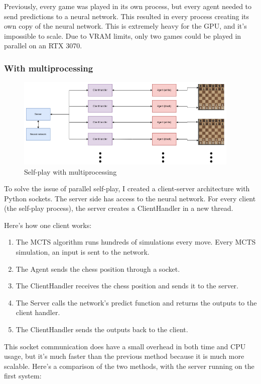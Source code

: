 \documentclass{article}
\begin{document}
Previously, every game was played in its own process, but every agent needed to send predictions to a neural network.
This resulted in every process creating its own copy of the neural network. This is extremely heavy for the GPU, and
it's impossible to scale. Due to VRAM limits, only two games could be played in parallel on an RTX 3070.

\subsubsection{With multiprocessing}

\begin{figure}[H]
    \centering
    \includegraphics[width=0.95\textwidth]{img/with-multiprocessing.png}
    \caption{Self-play with multiprocessing}
\end{figure}

To solve the issue of parallel self-play, I created a client-server architecture with Python sockets.
The server side has access to the neural network. For every client (the self-play process), 
the server creates a ClientHandler in a new thread.

Here's how one client works:

\begin{enumerate}
    \item The MCTS algorithm runs hundreds of simulations every move. Every MCTS simulation, an input is sent to the network.
    \item The Agent sends the chess position through a socket.
    \item The ClientHandler receives the chess position and sends it to the server.
    \item The Server calls the network's predict function and returns the outputs to the client handler.
    \item The ClientHandler sends the outputs back to the client.
\end{enumerate}

This socket communication does have a small overhead in both time and CPU usage, but it's much faster than the previous method
because it is much more scalable. Here's a comparison of the two methods, with the server running on the first system:
\end{document}
